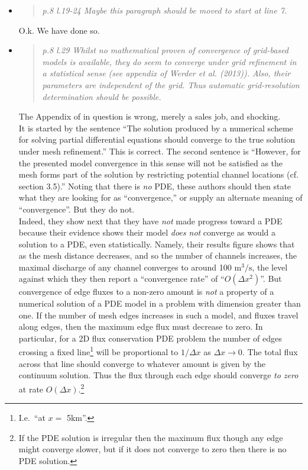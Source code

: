 \documentclass[11pt,reqno]{amsart}
\newcommand{\reply}[2]{
\medskip\medskip
\item  \begin{quote}
\emph{#1}
\end{quote}

\medskip
\noindent #2}
\begin{document}
\begin{itemize}
\reply{p.8 l.19-24 Maybe this paragraph should be moved to start at line 7.}
{O.k.  We have done so.}

\reply{p.8 l.29 Whilst no mathematical proven of convergence of grid-based models is available,  they do seem to converge under grid refinement in a statistical sense (see appendix of Werder et al. (2013)).  Also, their parameters are independent of the grid.  Thus automatic grid-resolution determination should be possible.}
{The Appendix of \cite{Werderetal2013} in question is wrong, merely a sales job, and shocking. \\
\indent It is started by the sentence ``The solution produced by a numerical scheme for solving partial differential equations should converge to the true solution under mesh refinement.''  This is correct.  The second sentence is ``However, for the presented model convergence in this sense will not be satisfied as the mesh forms part of the solution by restricting potential channel locations (cf. section 3.5).''  Noting that there is \emph{no} PDE, these authors should then state what they are looking for as ``convergence,'' or supply an alternate meaning of ``convergence''.  But they do not.  \\
\indent Indeed, they show next that they have \emph{not} made progress toward a PDE because their evidence shows their model \emph{does not} converge as would a solution to a PDE, even statistically. Namely, their results figure shows that as the mesh distance decreases, and so the number of channels increases, the maximal discharge of any channel converges to around 100 $\text{m}^3/\text{s}$, the level against which they then report a ``convergence rate'' of ``$O(\Delta x^2)$''.  But convergence of edge fluxes to a non-zero amount is \emph{not} a property of a numerical solution of a PDE model in a problem with dimension greater than one.  If the number of mesh edges increases in such a model, and fluxes travel along edges, then the maximum edge flux must decrease to zero.  In particular, for a 2D flux conservation PDE problem the number of edges crossing a fixed line\footnote{I.e.~``at $x=$ 5km''.} will be proportional to $1/\Delta x$ as $\Delta x\to 0$.  The total flux across that line should converge to whatever amount is given by the continuum solution.  Thus the flux through each edge should converge \emph{to zero} at rate $O(\Delta x)$.\footnote{If the PDE solution is irregular then the maximum flux though any edge might converge slower, but if it does not converge to zero then there is no PDE solution.}  \\
}
\end{itemize}
\end{document}
